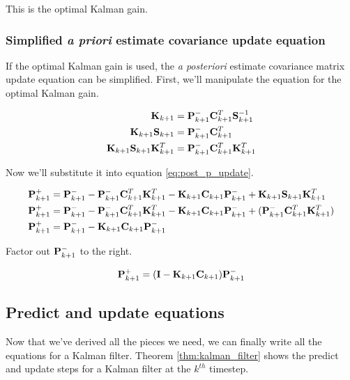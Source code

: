 This is the optimal Kalman gain.

\subsubsection{Simplified \textit{a priori} estimate covariance update equation}

If the optimal Kalman gain is used, the \textit{a posteriori} estimate
covariance matrix update equation can be simplified. First, we'll manipulate the
equation for the optimal Kalman gain.

\begin{align*}
  \mathbf{K}_{k+1} &= \mathbf{P}_{k+1}^-\mathbf{C}_{k+1}^T\mathbf{S}_{k+1}^{-1} \\
  \mathbf{K}_{k+1}\mathbf{S}_{k+1} &= \mathbf{P}_{k+1}^-\mathbf{C}_{k+1}^T \\
  \mathbf{K}_{k+1}\mathbf{S}_{k+1}\mathbf{K}_{k+1}^T &=
    \mathbf{P}_{k+1}^-\mathbf{C}_{k+1}^T\mathbf{K}_{k+1}^T
\end{align*}

Now we'll substitute it into equation \eqref{eq:post_p_update}.

\begin{align*}
  \mathbf{P}_{k+1}^+ &=
    \mathbf{P}_{k+1}^- - \mathbf{P}_{k+1}^-\mathbf{C}_{k+1}^T\mathbf{K}_{k+1}^T -
    \mathbf{K}_{k+1}\mathbf{C}_{k+1}\mathbf{P}_{k+1}^- +
    \mathbf{K}_{k+1}\mathbf{S}_{k+1}\mathbf{K}_{k+1}^T \\
  \mathbf{P}_{k+1}^+ &=
    \mathbf{P}_{k+1}^- - \mathbf{P}_{k+1}^-\mathbf{C}_{k+1}^T\mathbf{K}_{k+1}^T -
    \mathbf{K}_{k+1}\mathbf{C}_{k+1}\mathbf{P}_{k+1}^- +
    (\mathbf{P}_{k+1}^-\mathbf{C}_{k+1}^T\mathbf{K}_{k+1}^T) \\
  \mathbf{P}_{k+1}^+ &=
    \mathbf{P}_{k+1}^- - \mathbf{K}_{k+1}\mathbf{C}_{k+1}\mathbf{P}_{k+1}^-
\end{align*}

Factor out $\mathbf{P}_{k+1}^-$ to the right.

\begin{equation*}
  \mathbf{P}_{k+1}^+ = (\mathbf{I} - \mathbf{K}_{k+1}\mathbf{C}_{k+1})\mathbf{P}_{k+1}^-
\end{equation*}

\subsection{Predict and update equations}

Now that we've derived all the pieces we need, we can finally write all the
equations for a Kalman filter. Theorem \ref{thm:kalman_filter} shows the predict
and update steps for a Kalman filter at the $k^{th}$ timestep.

